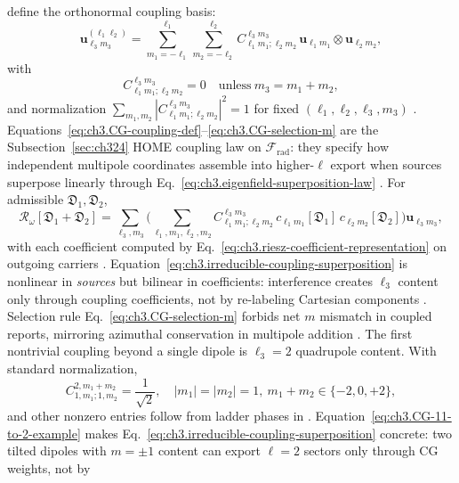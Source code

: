 define the orthonormal coupling basis:
\begin{equation}
\label{eq:ch3.CG-coupling-def}
\mathbf{u}_{\ell_3 m_3}^{(\ell_1\ell_2)}
=
\sum_{m_1=-\ell_1}^{\ell_1}
\sum_{m_2=-\ell_2}^{\ell_2}
C_{\ell_1 m_1;\ell_2 m_2}^{\ell_3 m_3}\,
\mathbf{u}_{\ell_1 m_1}\otimes \mathbf{u}_{\ell_2 m_2},
\end{equation}
with
\begin{equation}
\label{eq:ch3.CG-selection-m}
C_{\ell_1 m_1;\ell_2 m_2}^{\ell_3 m_3}=0
\quad\text{unless}\
m_3=m_1+m_2,
\end{equation}
and normalization \(\sum_{m_1,m_2}|C_{\ell_1 m_1;\ell_2 m_2}^{\ell_3 m_3}|^{2}=1\) for fixed \((\ell_1,\ell_2,\ell_3,m_3)\)
. Equations~\eqref{eq:ch3.CG-coupling-def}--\eqref{eq:ch3.CG-selection-m} are the
Subsection~\ref{sec:ch324} HOME coupling law on \(\mathcal{F}_{\mathrm{rad}}\): they specify how independent
multipole coordinates assemble into higher-\(\ell\) export when sources superpose linearly through
Eq.~\eqref{eq:ch3.eigenfield-superposition-law} .
For admissible \(\mathfrak{D}_1,\mathfrak{D}_2\),
\begin{equation}
\label{eq:ch3.irreducible-coupling-superposition}
\mathcal{R}_\omega[\mathfrak{D}_1+\mathfrak{D}_2]
=
\sum_{\ell_3,m_3}
\Bigg(
\sum_{\ell_1,m_1,\ell_2,m_2}
C_{\ell_1 m_1;\ell_2 m_2}^{\ell_3 m_3}\,
c_{\ell_1 m_1}[\mathfrak{D}_1]\,
c_{\ell_2 m_2}[\mathfrak{D}_2]
\Bigg)
\mathbf{u}_{\ell_3 m_3},
\end{equation}
with each coefficient computed by Eq.~\eqref{eq:ch3.riesz-coefficient-representation} on outgoing carriers
. Equation~\eqref{eq:ch3.irreducible-coupling-superposition} is nonlinear in
\emph{sources} but bilinear in coefficients: interference creates \(\ell_3\) content only through coupling
coefficients, not by re-labeling Cartesian components . Selection rule
Eq.~\eqref{eq:ch3.CG-selection-m} forbids net \(m\) mismatch in coupled reports, mirroring azimuthal
conservation in multipole addition .
The first nontrivial coupling beyond a single dipole is \(\ell_3=2\) quadrupole content. With standard
normalization,
\begin{equation}
\label{eq:ch3.CG-11-to-2-example}
C_{1,m_1;1,m_2}^{2,m_1+m_2}
=
\frac{1}{\sqrt{2}},
\quad
|m_1|=|m_2|=1,\ m_1+m_2\in\{-2,0,+2\},
\end{equation}
and other nonzero entries follow from ladder phases in
. Equation~\eqref{eq:ch3.CG-11-to-2-example} makes Eq.~\eqref{eq:ch3.irreducible-coupling-superposition}
concrete: two tilted dipoles with \(m=\pm1\) content can export \(\ell=2\) sectors only through CG weights, not by
